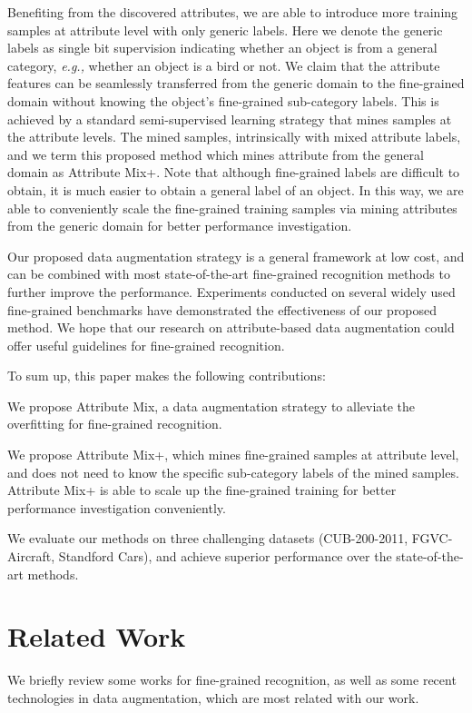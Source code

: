 \documentclass[runningheads]{llncs}
\begin{document}
Benefiting from the discovered attributes, we are able to introduce more training samples at attribute level with only generic labels. Here we denote the generic labels as single bit supervision indicating whether an object is from a general category, \emph{e.g.,} whether an object is a bird or not. We claim that the attribute features can be seamlessly transferred from the generic domain to the fine-grained domain without knowing the object's fine-grained sub-category labels. This is achieved by a standard semi-supervised learning strategy that mines samples at the attribute levels. The mined samples, intrinsically with mixed attribute labels, and we term this proposed method which mines attribute from the general domain as Attribute Mix+. Note that although fine-grained labels are difficult to obtain, it is much easier to obtain a general label of an object. In this way, we are able to conveniently scale the fine-grained training samples via mining attributes from the generic domain for better performance investigation.


Our proposed data augmentation strategy is a general framework at low cost, and can be combined with most state-of-the-art fine-grained recognition methods to further improve the performance. Experiments conducted on several widely used fine-grained benchmarks have demonstrated the effectiveness of our proposed method.  We hope that our research on attribute-based data augmentation could offer useful guidelines for fine-grained recognition.


To sum up, this paper makes the following contributions:

 We propose Attribute Mix, a data augmentation strategy to alleviate the overfitting for fine-grained recognition.

 We propose Attribute Mix+, which mines fine-grained samples at attribute level, and does not need to know the specific sub-category labels of the mined samples. Attribute Mix+ is able to scale up the fine-grained training for better performance investigation conveniently.

 We evaluate our methods on three challenging datasets (CUB-200-2011, FGVC-Aircraft, Standford Cars), and achieve superior performance over the state-of-the-art methods.

\section{Related Work}


\noindent We briefly review some works for fine-grained recognition, as well as some recent technologies in data augmentation, which are most related with our work.
\end{document}
